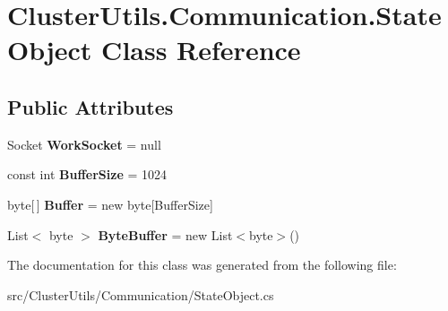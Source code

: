\hypertarget{class_cluster_utils_1_1_communication_1_1_state_object}{}\section{Cluster\+Utils.\+Communication.\+State\+Object Class Reference}
\label{class_cluster_utils_1_1_communication_1_1_state_object}
\subsection*{Public Attributes}
\begin{DoxyCompactItemize}
\item 
\hypertarget{class_cluster_utils_1_1_communication_1_1_state_object_ac086ce022d558e4f95e12be69130b21a}{}Socket {\bfseries Work\+Socket} = null\label{class_cluster_utils_1_1_communication_1_1_state_object_ac086ce022d558e4f95e12be69130b21a}

\item 
\hypertarget{class_cluster_utils_1_1_communication_1_1_state_object_a5ebc396b146e3456a3517b6fc27cb2e8}{}const int {\bfseries Buffer\+Size} = 1024\label{class_cluster_utils_1_1_communication_1_1_state_object_a5ebc396b146e3456a3517b6fc27cb2e8}

\item 
\hypertarget{class_cluster_utils_1_1_communication_1_1_state_object_a3ac3d5b6d66752e4eef78b3ac14be3bd}{}byte\mbox{[}$\,$\mbox{]} {\bfseries Buffer} = new byte\mbox{[}Buffer\+Size\mbox{]}\label{class_cluster_utils_1_1_communication_1_1_state_object_a3ac3d5b6d66752e4eef78b3ac14be3bd}

\item 
\hypertarget{class_cluster_utils_1_1_communication_1_1_state_object_a6a24d0e1a6df277aa5975c3b7bfd790c}{}List$<$ byte $>$ {\bfseries Byte\+Buffer} = new List$<$byte$>$()\label{class_cluster_utils_1_1_communication_1_1_state_object_a6a24d0e1a6df277aa5975c3b7bfd790c}

\end{DoxyCompactItemize}


The documentation for this class was generated from the following file\+:\begin{DoxyCompactItemize}
\item 
src/\+Cluster\+Utils/\+Communication/State\+Object.\+cs\end{DoxyCompactItemize}
